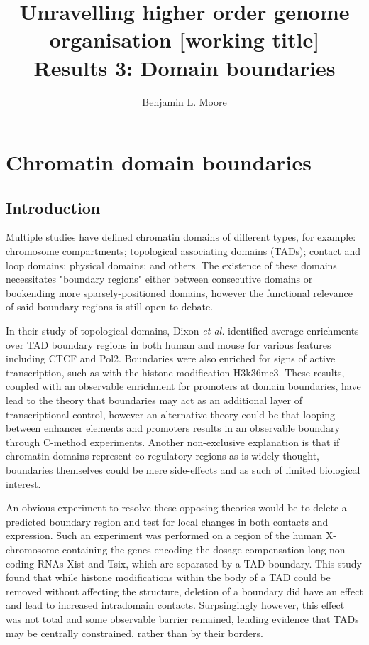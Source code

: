 \documentclass[a4paper,10pt,oneside]{book}
\title{ \vspace{3in} Unravelling higher order genome organisation {\small [working
    title]} \\ \vspace{2em} {\large {\bf Results 3: Domain boundaries}} }
\author{Benjamin L. Moore}
\begin{document}
\maketitle

\chapter{Chromatin domain boundaries}

\section{Introduction}

Multiple studies have defined chromatin domains of different types, for example: chromosome compartments;\cite{Lieberman2009} topological associating domains (TADs);\cite{Dixon2012} contact and loop domains;\cite{Rao2014} physical domains;\cite{Sexton2012, Hou2012} and others.\cite{Filippova2014} The existence of these domains necessitates "boundary regions" either between consecutive domains or bookending more sparsely-positioned domains, however the functional relevance of said boundary regions is still open to debate.

In their study of topological domains, Dixon \emph{et al.} identified average enrichments over TAD boundary regions in both human and mouse for various features including CTCF and Pol2.\cite{Dixon2012} Boundaries were also enriched for signs of active transcription, such as with the histone modification H3k36me3. These results, coupled with an observable enrichment for promoters at domain boundaries, have lead to the theory that boundaries may act as an additional layer of transcriptional control,\cite{Sexton2015} however an alternative theory could be that looping between enhancer elements and promoters results in an observable boundary through C-method experiments.\cite{Rao2014} Another non-exclusive explanation is that if chromatin domains represent co-regulatory regions as is widely thought,\cite{LeDily2014, Nora2013, Sexton2015} boundaries themselves could be mere side-effects and as such of limited biological interest.

An obvious experiment to resolve these opposing theories would be to delete a predicted boundary region and test for local changes in both contacts and expression. Such an experiment was performed on a region of the human X-chromosome containing the genes encoding the dosage-compensation long non-coding RNAs Xist and Tsix, which are separated by a TAD boundary.\cite{Nora2012} This study found that while histone modifications within the body of a TAD could be removed without affecting the structure, deletion of a boundary did have an effect and lead to increased intradomain contacts.\cite{Nora2012} Surpsingingly however, this effect was not total and some observable barrier remained, lending evidence that TADs may be centrally constrained, rather than by their borders.\cite{Nora2012} 
\end{document}
